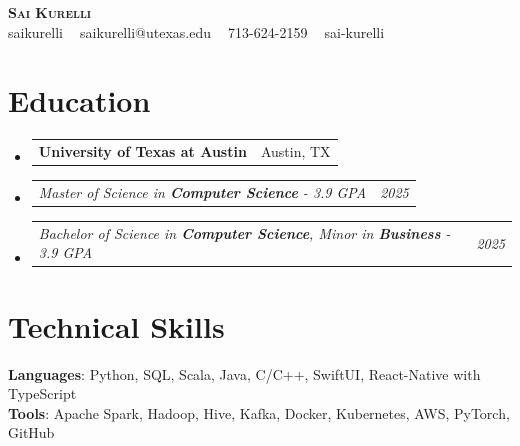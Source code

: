 \documentclass[letterpaper,11pt]{article}
\makeatletter
\newcommand{\resumeItem}[1]{
  \item\small{
    {#1 \vspace{-4pt}}
  }
}
\newcommand{\resumeSubSubheading}[2]{
    \item
    \begin{tabular*}{0.97\textwidth}{l@{\extracolsep{\fill}}r}
      \textit{\small#1} & \textit{\small #2} \\
    \end{tabular*}\vspace{-7pt}
}
\newcommand{\resumeEduHeading}[2]{
  \vspace{-2pt}\item
    \begin{tabular*}{0.97\textwidth}[t]{l@{\extracolsep{\fill}}r}
      \textbf{#1} & \footnotesize{#2} \\
    \end{tabular*}\vspace{-7pt}
}
\newcommand{\resumeSubHeadingListStart}{\begin{itemize}[leftmargin=0.15in, label={}]}
\newcommand{\resumeSubHeadingListEnd}{\end{itemize}}
\newcommand{\resumeItemListStart}{\begin{itemize}}
\newcommand{\resumeItemListEnd}{\end{itemize}\vspace{-7pt}}
\makeatother
\begin{document}

\begin{center}
	\textbf{\huge \scshape Sai Kurelli} \\ \vspace{3pt}
	\footnotesize \faGithub{} saikurelli $\;\;$ \faEnvelope{} saikurelli@utexas.edu $\;\;$ \faPhone{} 713-624-2159 $\;\;$\faLinkedin{} sai-kurelli
\end{center}


\section{Education}
\resumeSubHeadingListStart
\resumeEduHeading
{University of Texas at Austin}{Austin, TX}
\resumeSubSubheading
{\hspace{0.07in}Master of Science in \textbf{Computer Science} - 3.9 GPA}{2025}
\resumeSubSubheading
{\hspace{0.07in}Bachelor of Science in \textbf{Computer Science}, Minor in \textbf{Business} - 3.9 GPA}{2025}
\resumeSubHeadingListEnd


\section{Technical Skills}
\begin{itemize}[leftmargin=0.15in, label={}]
	\small{\item{
	      \textbf{Languages}{: Python, SQL, Scala, Java, C/C++, SwiftUI, React-Native with TypeScript} \\
	      \textbf{Tools}{: Apache Spark, Hadoop, Hive, Kafka, Docker, Kubernetes, AWS, PyTorch, GitHub}
	      }}
\end{itemize}
\end{document}
